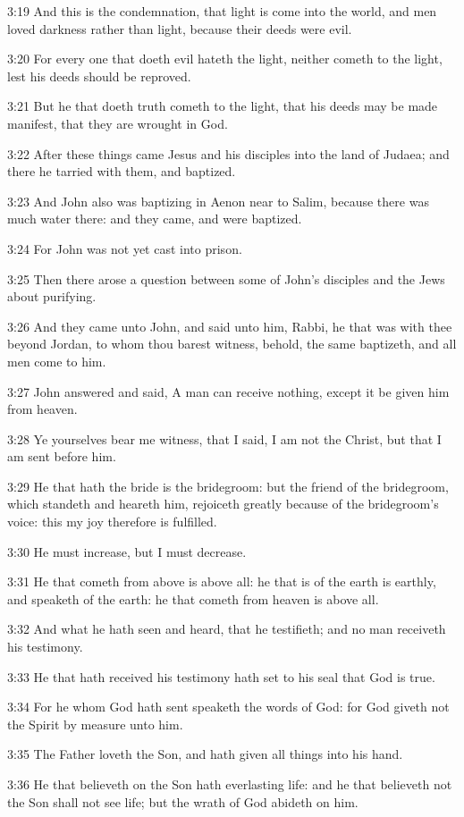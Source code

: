 3:19 And this is the condemnation, that light is come into the world,
and men loved darkness rather than light, because their deeds were
evil.

3:20 For every one that doeth evil hateth the light, neither cometh to
the light, lest his deeds should be reproved.

3:21 But he that doeth truth cometh to the light, that his deeds may
be made manifest, that they are wrought in God.

3:22 After these things came Jesus and his disciples into the land of
Judaea; and there he tarried with them, and baptized.

3:23 And John also was baptizing in Aenon near to Salim, because there
was much water there: and they came, and were baptized.

3:24 For John was not yet cast into prison.

3:25 Then there arose a question between some of John's disciples and
the Jews about purifying.

3:26 And they came unto John, and said unto him, Rabbi, he that was
with thee beyond Jordan, to whom thou barest witness, behold, the same
baptizeth, and all men come to him.

3:27 John answered and said, A man can receive nothing, except it be
given him from heaven.

3:28 Ye yourselves bear me witness, that I said, I am not the Christ,
but that I am sent before him.

3:29 He that hath the bride is the bridegroom: but the friend of the
bridegroom, which standeth and heareth him, rejoiceth greatly because
of the bridegroom's voice: this my joy therefore is fulfilled.

3:30 He must increase, but I must decrease.

3:31 He that cometh from above is above all: he that is of the earth
is earthly, and speaketh of the earth: he that cometh from heaven is
above all.

3:32 And what he hath seen and heard, that he testifieth; and no man
receiveth his testimony.

3:33 He that hath received his testimony hath set to his seal that God
is true.

3:34 For he whom God hath sent speaketh the words of God: for God
giveth not the Spirit by measure unto him.

3:35 The Father loveth the Son, and hath given all things into his
hand.

3:36 He that believeth on the Son hath everlasting life: and he that
believeth not the Son shall not see life; but the wrath of God abideth
on him.

